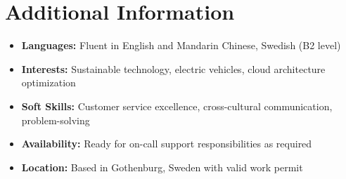 \documentclass[11pt,a4paper]{article}
\begin{document}
\vspace{6pt}
\section*{Additional Information}
\begin{itemize}[noitemsep]
\item \textbf{Languages:} Fluent in English and Mandarin Chinese, Swedish (B2 level)
\item \textbf{Interests:} Sustainable technology, electric vehicles, cloud architecture optimization
\item \textbf{Soft Skills:} Customer service excellence, cross-cultural communication, problem-solving
\item \textbf{Availability:} Ready for on-call support responsibilities as required
\item \textbf{Location:} Based in Gothenburg, Sweden with valid work permit
\end{itemize}
\end{document}
